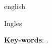 \begin{resumo}[Abstract]
 \begin{otherlanguage*}{english}


Ingles
 
	\vspace{\onelineskip}
	\noindent 
	\textbf{Key-words}: .
 \end{otherlanguage*}
\end{resumo}